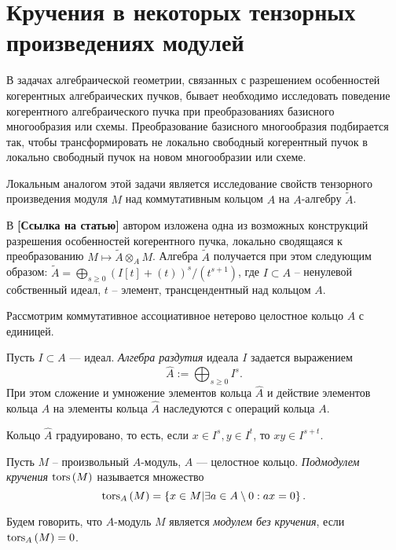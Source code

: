 \section{Кручения в некоторых тензорных произведениях модулей}
    В задачах алгебраической геометрии, связанных с разрешением особенностей когерентных 
    алгебраических пучков, бывает необходимо 
    исследовать поведение когерентного алгебраического пучка при преобразованиях базисного 
    многообразия или схемы.
    Преобразование базисного многообразия подбирается так, чтобы трансформировать не локально 
    свободный когерентный пучок в локально
    свободный пучок на новом многообразии или схеме. 

    Локальным аналогом этой задачи является исследование свойств тензорного произведения модуля $M$ 
    над коммутативным кольцом $A$ на $A$-алгебру $\widetilde{A}$.

    В \textbf{[Ссылка на статью]} автором изложена одна из возможных конструкций разрешения особенностей когерентного пучка, 
    локально сводящаяся к преобразованию $M \mapsto \widetilde{A} \otimes_A M$.
    Алгебра $\widetilde{A}$ получается при этом следующим образом: 
    $\widetilde{A} = \bigoplus_{s \geq 0} (I[t] + (t))^s / (t^{s + 1})$, где $I \subset A$ -- 
    ненулевой собственный
    идеал, $t$ -- элемент, трансцендентный над кольцом $A$.

    Рассмотрим коммутативное ассоциативное нетерово целостное кольцо $A$ с единицей. 
    
    \begin{Def}
        Пусть $I \subset A$ --- идеал. \textit{Алгебра раздутия} идеала $I$ задается выражением 
        $$\widehat{A} := \bigoplus_{s \geq 0} I^s.$$
        При этом сложение и умножение элементов кольца $\widehat{A}$ и действие элементов кольца $A$
        на элементы кольца $\widehat{A}$ наследуются с операций кольца $A$.
    \end{Def}
    Кольцо $\widehat{A}$ градуировано, то есть, если $x \in I^s, y \in I^t$, то $xy \in I^{s + t}$.

    \begin{Def}
        Пусть $M$ -- произвольный $A$-модуль, $A$ --- целостное кольцо. 
        \textit{Подмодулем кручения} $\textup{tors}\left(M\right)$ называется множество
        \begin{equation*}
            \textup{tors}_{A}\left(M\right) = \left\{x \in M | \exists a \in A\setminus 0 : ax = 0 \right\}.
        \end{equation*}
    \end{Def}
    \begin{Def}
        Будем говорить, что $A$-модуль $M$ является \textit{модулем без кручения}, если $\textup{tors}_{A}\left(M\right) = 0$.
    \end{Def}


